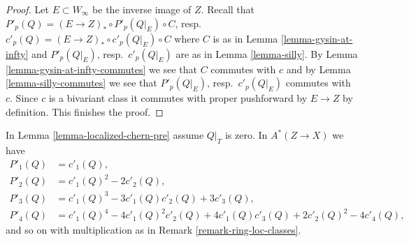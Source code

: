 \begin{proof}
Let $E \subset W_\infty$ be the inverse image of $Z$.
Recall that $P'_p(Q) = (E \to Z)_* \circ P'_p(Q|_E) \circ C$,
resp.\ $c'_p(Q) = (E \to Z)_* \circ c'_p(Q|_E) \circ C$
where $C$ is as in Lemma \ref{lemma-gysin-at-infty} and
$P'_p(Q|_E)$, resp.\ $c'_p(Q|_E)$ are as in
Lemma \ref{lemma-silly}.
By Lemma \ref{lemma-gysin-at-infty-commutes}
we see that $C$ commutes with $c$
and by Lemma \ref{lemma-silly-commutes} we see that
$P'_p(Q|_E)$, resp.\ $c'_p(Q|_E)$ commutes with $c$.
Since $c$ is a bivariant class it commutes with proper
pushforward by $E \to Z$ by definition. This finishes the proof.
\end{proof}

\begin{lemma}
\label{lemma-localized-chern-pre-compose}
In Lemma \ref{lemma-localized-chern-pre} assume $Q|_T$ is zero. In
$A^*(Z \to X)$ we have
\begin{align*}
P'_1(Q) & = c'_1(Q), \\
P'_2(Q) & = c'_1(Q)^2 - 2c'_2(Q), \\
P'_3(Q) & = c'_1(Q)^3 - 3c'_1(Q)c'_2(Q) + 3c'_3(Q), \\
P'_4(Q) & = c'_1(Q)^4 - 4c'_1(Q)^2c'_2(Q) +
4c'_1(Q)c'_3(Q) + 2c'_2(Q)^2 - 4c'_4(Q),
\end{align*}
and so on with multiplication as in Remark \ref{remark-ring-loc-classes}.
\end{lemma}

